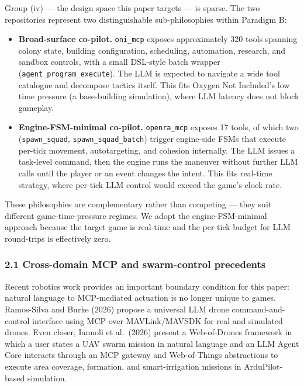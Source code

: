 \documentclass[
  journal]{IEEEtran}
\providecommand{\tightlist}{%
  \setlength{\itemsep}{0pt}\setlength{\parskip}{0pt}}
\begin{document}
Group (iv) --- the design space this paper targets --- is sparse. The
two repositories represent two distinguishable sub-philosophies within
Paradigm B:

\begin{itemize}
\tightlist
\item
  \textbf{Broad-surface co-pilot.} \texttt{oni\_mcp} exposes
  approximately 320 tools spanning colony state, building configuration,
  scheduling, automation, research, and sandbox controls, with a small
  DSL-style batch wrapper (\texttt{agent\_program\_execute}). The LLM is
  expected to navigate a wide tool catalogue and decompose tactics
  itself. This fits Oxygen Not Included's low time pressure (a
  base-building simulation), where LLM latency does not block gameplay.
\item
  \textbf{Engine-FSM-minimal co-pilot.} \texttt{openra\_mcp} exposes 17
  tools, of which two (\texttt{spawn\_squad},
  \texttt{spawn\_squad\_batch}) trigger engine-side FSMs that execute
  per-tick movement, autotargeting, and cohesion internally. The LLM
  issues a task-level command, then the engine runs the maneuver without
  further LLM calls until the player or an event changes the intent.
  This fits real-time strategy, where per-tick LLM control would exceed
  the game's clock rate.
\end{itemize}

These philosophies are complementary rather than competing --- they suit
different game-time-pressure regimes. We adopt the engine-FSM-minimal
approach because the target game is real-time and the per-tick budget
for LLM round-trips is effectively zero.

\subsubsection{2.1 Cross-domain MCP and swarm-control
precedents}\label{cross-domain-mcp-and-swarm-control-precedents}

Recent robotics work provides an important boundary condition for this
paper: natural language to MCP-mediated actuation is no longer unique to
games. Ramos-Silva and Burke (2026) propose a universal LLM drone
command-and-control interface using MCP over MAVLink/MAVSDK for real and
simulated drones. Even closer, Iannoli et al.~(2026) present a
Web-of-Drones framework in which a user states a UAV swarm mission in
natural language and an LLM Agent Core interacts through an MCP gateway
and Web-of-Things abstractions to execute area coverage, formation, and
smart-irrigation missions in ArduPilot-based simulation.
\end{document}
